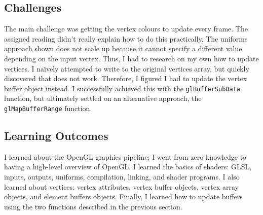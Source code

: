 \documentclass[a4paper, 12pt]{scrartcl}
\begin{document}
\subsection{Challenges}
The main challenge was getting the vertex colours to update every frame. The assigned reading didn't really explain how to do this practically. The uniforms approach shown does not scale up because it cannot specify a different value depending on the input vertex. Thus, I had to research on my own how to update vertices. I naïvely attempted to write to the original vertices array, but quickly discovered that does not work. Therefore, I figured I had to update the vertex buffer object instead. I successfully achieved this with the \texttt{glBufferSubData} function, but ultimately settled on an alternative approach, the \texttt{glMapBufferRange} function.

\subsection{Learning Outcomes}
I learned about the OpenGL graphics pipeline; I went from zero knowledge to having a high-level overview of OpenGL. I learned the basics of shaders: GLSL, inputs, outputs, uniforms, compilation, linking, and shader programs. I also learned about vertices: vertex attributes, vertex buffer objects, vertex array objects, and element buffers objects. Finally, I learned how to update buffers using the two functions described in the previous section.
\end{document}
